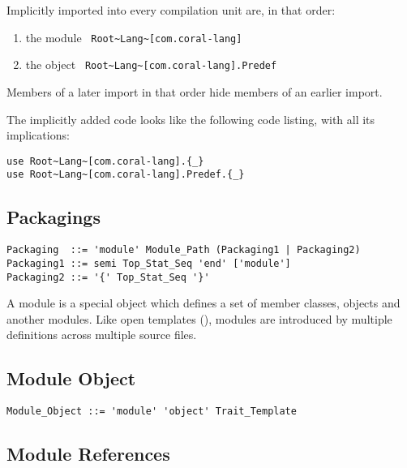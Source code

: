 Implicitly imported into every compilation unit are, in that order: 
\begin{enumerate}
\item the module ~\lstinline!Root~Lang~[com.coral-lang]! 
\item the object ~\lstinline!Root~Lang~[com.coral-lang].Predef!
\end{enumerate} 
Members of a later import in that order hide members of an earlier import. 


The implicitly added code looks like the following code listing, with all its implications:
\begin{lstlisting}
use Root~Lang~[com.coral-lang].{_}
use Root~Lang~[com.coral-lang].Predef.{_}
\end{lstlisting}





\subsection{Packagings}

\syntax\begin{lstlisting}
Packaging  ::= 'module' Module_Path (Packaging1 | Packaging2)
Packaging1 ::= semi Top_Stat_Seq 'end' ['module']
Packaging2 ::= '{' Top_Stat_Seq '}'
\end{lstlisting}

A module is a special object which defines a set of member classes, objects and another modules. Like open templates (), modules are introduced by multiple definitions across multiple source files.  






\subsection{Module Object}

\syntax\begin{lstlisting}
Module_Object ::= 'module' 'object' Trait_Template
\end{lstlisting}






\subsection{Module References}

